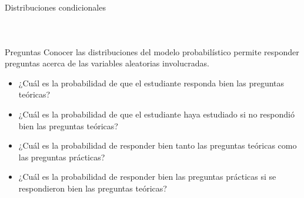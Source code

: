 \documentclass{beamer}
\begin{document}
\begin{frame}{Distribuciones condicionales}
\begin{columns}
\begin{column}{0.45\textwidth}
{\begin{table}
{\begin{tabular}{|c|c|c|}
                        \end{tabular}
                    }
                \end{table}
            }
        \end{column}
        \begin{column}{0.55\textwidth}
            \centering
        \end{column}
    \end{columns}
\end{frame}

\begin{frame}{Preguntas}
    Conocer las distribuciones del modelo probabilístico permite responder preguntas acerca de las variables aleatorias involucradas.
    \begin{itemize}
        \item<2> ¿Cuál es la probabilidad de que el estudiante responda bien las preguntas teóricas?
        \item<3> ¿Cuál es la probabilidad de que el estudiante haya estudiado si no respondió bien las preguntas teóricas?
        \item<4> ¿Cuál es la probabilidad de responder bien tanto las preguntas teóricas como las preguntas prácticas?
        \item<5> ¿Cuál es la probabilidad de responder bien las preguntas prácticas si se respondieron bien las preguntas teóricas?
    \end{itemize}
\end{frame}
\end{document}
